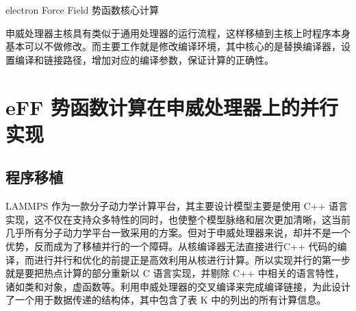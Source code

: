 \begin{algorithm}[h]
  \SetAlgoLined

  \For {$i\in[0...n)$}{
      \For {$j\in L_j$}{
        $\vec{r_{ij}} \leftarrow \vec{x_i}-\vec{x_j}$\;
        $ r_{ij}^2 \leftarrow r_{ij}·r_{ij}$\;
        \If {$r_{ij}^2 < r_{cut}^2$}{
          $ dspline_i \leftarrow cutoff(r_{ij})$\;
          \uIf {$S_i = 0 \&\& S_j = 0$}{
            $fpair,ecoul \leftarrow ElecNucNuc(Q,r_{ij})$\;
          }\uElseIf{$S_i = 0 \&\& abs(S_j) = 1$}{
              $fpair,ecoul \leftarrow ElecNucElec(Q,r_{ij})$\;
          }\uElseIf{$abs(S_i = 1) \&\& S_j = 0$}{
            $fpair,ecoul \leftarrow ElecNucElec(Q,r_{ij})$\;
          }\ElseIf{$abs(S_i = 1) \&\& abs(S_j) = 1$}{
            $fpair,ecoul \leftarrow ElecElecElec(Q,r_{ij})$\;
          }
          $fpair \leftarrow fpair·dspline$\;
          $E \leftarrow ecoul·dspline$\;
          $\vec{f} \leftarrow SmallRForce(fpair,\vec{X})$\;
          $\vec{F_i} \leftarrow \vec{F_i}+\vec{f}$\;
          $\vec{F_j} \leftarrow \vec{F_j}+\vec{f}$\;
        }
      }
  }
  \caption{electron Force Field 势函数核心计算}
  \label{algo:algorithm1}
\end{algorithm}



申威处理器主核具有类似于通用处理器的运行流程，这样移植到主核上时程序本身基本可以不做修改。而主要工作就是修改编译环境，其中核心的是替换编译器，设置编译和链接路径，增加对应的编译参数，保证计算的正确性。

\section{eFF 势函数计算在申威处理器上的并行实现}
\subsection{程序移植}
LAMMPS 作为一款分子动力学计算平台，其主要设计模型主要是使用 C++ 语言实现，这不仅在支持众多特性的同时，也使整个模型脉络和层次更加清晰，这当前几乎所有分子动力学平台一致采用的方案。但对于申威处理器来说，却并不是一个优势，反而成为了移植并行的一个障碍。从核编译器无法直接进行C++ 代码的编译，而进行并行和优化的前提正是高效利用从核进行计算。所以实现并行的第一步就是要把热点计算的部分重新以 C 语言实现，并剔除 C++ 中相关的语言特性，诸如类和对象，虚函数等。利用申威处理器的交叉编译来完成编译链接，为此设计了一个用于数据传递的结构体，其中包含了表 K 中的列出的所有计算信息。

